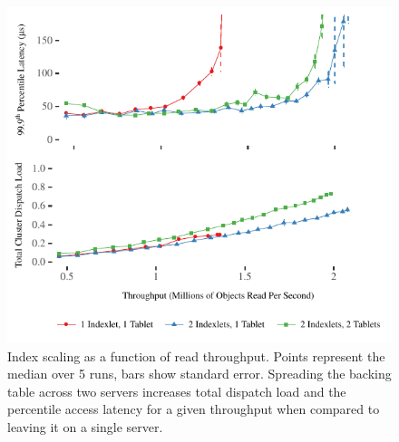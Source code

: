 \begin{figure}[t]
\includegraphics[width=\columnwidth]{graphs/index-motivation}
\caption{Index scaling as a function of read throughput. Points represent
    the median over 5 runs, bars show standard error. Spreading the
    backing table across two servers increases total dispatch load and
    the \nnnth percentile access latency for a given throughput when compared
    to leaving it on a single server.}
\label{fig:index-load}
\end{figure}
